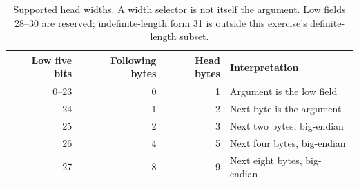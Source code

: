 \begin{table}[htbp]
  \centering
  \begin{tabular}{r r r l}
    \toprule
    Low five bits & Following bytes & Head bytes & Interpretation               \\
    \midrule
    0--23         & 0               & 1          & Argument is the low field    \\
    24            & 1               & 2          & Next byte is the argument    \\
    25            & 2               & 3          & Next two bytes, big-endian   \\
    26            & 4               & 5          & Next four bytes, big-endian  \\
    27            & 8               & 9          & Next eight bytes, big-endian \\
    \bottomrule
  \end{tabular}
  \caption{Supported head widths. A width selector is not itself the argument. Low fields 28--30 are reserved; indefinite-length form 31 is outside this exercise's definite-length subset.}
  \label{tab:revision-cbor-widths}
\end{table}
